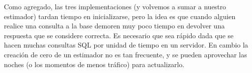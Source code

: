 Como agregado, las tres implementaciones (y volvemos a sumar a nuestro estimador) tardan tiempo en inicializarse, pero la idea es que cuando alguien realice una consulta a la base demoren muy poco tiempo en devolver una respuesta que se considere correcta. Es necesario que sea rápido dada que se hacen muchas consultas SQL por unidad de tiempo en un servidor. En cambio la creación de cero de un estimador no es tan frecuente, y se pueden aprovechar las noches (o los momentos de menos tráfico) para actualizarlo. 
